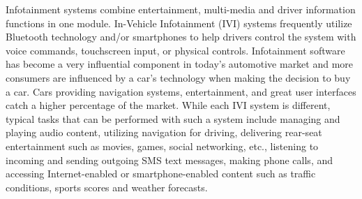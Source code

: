 Infotainment systems combine entertainment, multi-media and driver information functions in one module. In-Vehicle Infotainment (IVI) systems frequently utilize Bluetooth technology and/or smartphones to help drivers control the system with voice commands, touchscreen input, or physical controls.
Infotainment software has become a very influential component in today’s automotive market and more consumers are influenced by a car’s technology when making the decision to buy a car. Cars providing navigation systems, entertainment, and great user interfaces catch a higher percentage of the market. 
While each IVI system is different, typical tasks that can be performed with such a system include managing and playing audio content, utilizing navigation for driving, delivering rear-seat entertainment such as movies, games, social networking, etc., listening to incoming and sending outgoing SMS text messages, making phone calls, and accessing Internet-enabled or smartphone-enabled content such as traffic conditions, sports scores and weather forecasts.
